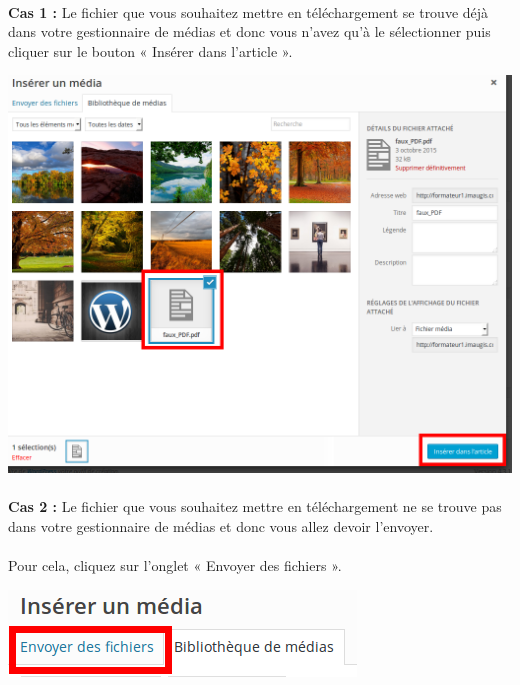 \documentclass[10pt,a4paper]{article}
\begin{document}
\paragraph{}\textbf{Cas 1 : }Le fichier que vous souhaitez mettre en téléchargement se trouve déjà dans votre gestionnaire de médias et donc vous n'avez qu'à le sélectionner puis cliquer sur le bouton « Insérer dans l'article ».
\begin{center}
\includegraphics[scale=0.3]{img/0082.png}
\end{center}
\paragraph{}\textbf{Cas 2 : }Le fichier que vous souhaitez mettre en téléchargement ne se trouve pas dans votre gestionnaire de médias et donc vous allez devoir l'envoyer.
\paragraph{}Pour cela, cliquez sur l'onglet « Envoyer des fichiers ».
\begin{center}
\includegraphics[scale=0.35]{img/0083.png}
\end{center}
\end{document}
